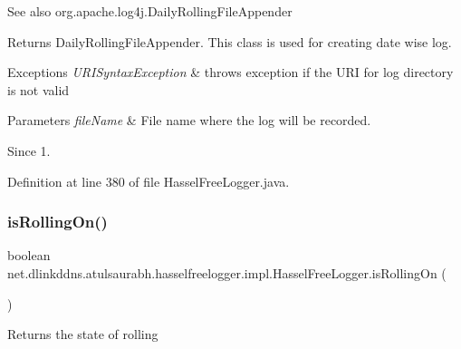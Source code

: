 \begin{DoxySeeAlso}{See also}
org.\+apache.\+log4j.\+Daily\+Rolling\+File\+Appender 
\end{DoxySeeAlso}
\begin{DoxyReturn}{Returns}
Daily\+Rolling\+File\+Appender. This class is used for creating date wise log. 
\end{DoxyReturn}

\begin{DoxyExceptions}{Exceptions}
{\em U\+R\+I\+Syntax\+Exception} & throws exception if the U\+RI for log directory is not valid \\
\hline
\end{DoxyExceptions}

\begin{DoxyParams}{Parameters}
{\em file\+Name} & File name where the log will be recorded. \\
\hline
\end{DoxyParams}
\begin{DoxySince}{Since}
1. 
\end{DoxySince}


Definition at line 380 of file Hassel\+Free\+Logger.\+java.

\mbox{\label{classnet_1_1dlinkddns_1_1atulsaurabh_1_1hasselfreelogger_1_1impl_1_1_hassel_free_logger_a1264dcefa68828985aa843e545ff41b6}} 
\subsubsection{\texorpdfstring{is\+Rolling\+On()}{isRollingOn()}}
{\footnotesize\ttfamily boolean net.\+dlinkddns.\+atulsaurabh.\+hasselfreelogger.\+impl.\+Hassel\+Free\+Logger.\+is\+Rolling\+On (\begin{DoxyParamCaption}{ }\end{DoxyParamCaption})}

\begin{DoxyReturn}{Returns}
the state of rolling 
\end{DoxyReturn}


